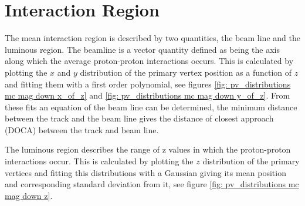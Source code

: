 \section{Interaction Region}
\label{section: interaction region}

The mean interaction region is described by two quantities, the beam line and the luminous region. The beamline is a vector quantity defined as being the axis along which the average proton-proton interactions occurs. This is calculated by plotting the $x$ and $y$ distribution of the primary vertex position as a function of $z$ and fitting them with a first order polynomial, see figures \ref{fig: pv_distributions mc mag down x_of_z} and \ref{fig: pv_distributions mc mag down y_of_z}. From these fits an equation of the beam line can be determined, the minimum distance between the track and the beam line gives the distance of closest approach (DOCA) between the track and beam line.

The luminous region describes the range of z values in which the proton-proton interactions occur. This is calculated by plotting the $z$ distribution of the primary vertices and fitting this distributions with a Gaussian giving its mean position and corresponding standard deviation from it, see figure \ref{fig: pv_distributions mc mag down z}.

%

